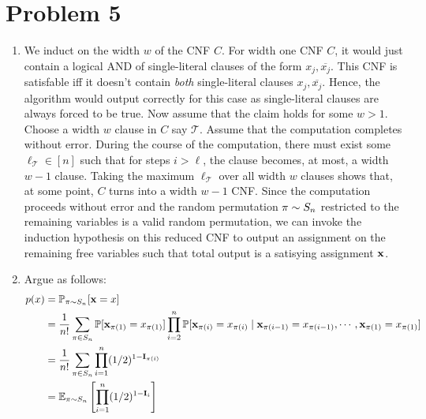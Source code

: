 \documentclass[12pt]{article}%
\begin{document}
\section*{Problem 5}
\begin{enumerate}
  \item We induct on the width $w$ of the CNF $C$. For width one CNF $C$, it would just contain a logical AND of single-literal clauses of the form $x_j, \overline{x_j}$. This CNF is satisfable iff it doesn't contain \emph{both} single-literal clauses $x_j, \overline{x_j}$. Hence, the algorithm would output correctly for this case as single-literal clauses are always forced to be true. Now assume that the claim holds for some $w > 1$. Choose a width $w$ clause in $C$ say $\mathcal{T}$. Assume that the computation completes without error. During the course of the computation, there must exist some $\ell_{\mathcal{T}} \in [n]$ such that for steps $i > \ell$, the clause becomes, at most, a width $w-1$ clause. Taking the maximum $\ell_{\mathcal{T}}$ over all width $w$ clauses shows that, at some point, $C$ turns into a width $w-1$ CNF. Since the computation proceeds without error and the random permutation ${\bf \pi} \sim S_n$ restricted to the remaining variables is a valid random permutation, we can invoke the induction hypothesis on this reduced CNF to output an assignment on the remaining free variables such that total output is a satisying assignment ${\bf x}$.

  \item
  Argue as follows:
  \begin{align*}
    p(x) & = \mathbb{P}_{\pi \sim S_n}[{\bf x} = x] \\
    & =  \frac{1}{n!} \sum_{\pi \in S_n}  \mathbb{P}[{\bf x}_{\pi(1)} = x_{\pi(1)}] \prod_{i = 2}^n \mathbb{P}[{\bf x}_{\pi(i)} = x_{\pi(i)} \mid {\bf x}_{\pi(i-1)} = x_{\pi(i-1)}, \cdots, {\bf x}_{\pi(1)} = x_{\pi(1)}] \\
    & = \frac{1}{n!} \sum_{\pi \in S_n}  \prod_{i=1}^n (1/2)^{1 - {\bf I}_{\pi(i)}} \\
    & = \mathbb{E}_{\pi \sim S_n} \left[ \prod_{i=1}^n (1/2)^{1 - {\bf I}_{i}} \right]
  \end{align*}




\end{enumerate}
\end{document}
